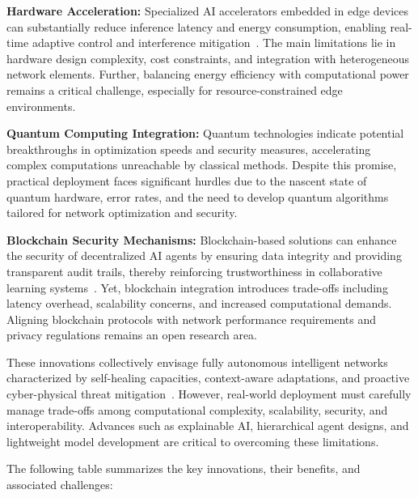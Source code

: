\documentclass[sigconf]{acmart}
\begin{document}
\textbf{Hardware Acceleration:} Specialized AI accelerators embedded in edge devices can substantially reduce inference latency and energy consumption, enabling real-time adaptive control and interference mitigation~\cite{ref50}. The main limitations lie in hardware design complexity, cost constraints, and integration with heterogeneous network elements. Further, balancing energy efficiency with computational power remains a critical challenge, especially for resource-constrained edge environments.

\textbf{Quantum Computing Integration:} Quantum technologies indicate potential breakthroughs in optimization speeds and security measures, accelerating complex computations unreachable by classical methods. Despite this promise, practical deployment faces significant hurdles due to the nascent state of quantum hardware, error rates, and the need to develop quantum algorithms tailored for network optimization and security.

\textbf{Blockchain Security Mechanisms:} Blockchain-based solutions can enhance the security of decentralized AI agents by ensuring data integrity and providing transparent audit trails, thereby reinforcing trustworthiness in collaborative learning systems~\cite{ref54}. Yet, blockchain integration introduces trade-offs including latency overhead, scalability concerns, and increased computational demands. Aligning blockchain protocols with network performance requirements and privacy regulations remains an open research area.

These innovations collectively envisage fully autonomous intelligent networks characterized by self-healing capacities, context-aware adaptations, and proactive cyber-physical threat mitigation~\cite{ref55}. However, real-world deployment must carefully manage trade-offs among computational complexity, scalability, security, and interoperability. Advances such as explainable AI, hierarchical agent designs, and lightweight model development are critical to overcoming these limitations.

\bigskip

The following table summarizes the key innovations, their benefits, and associated challenges:
\end{document}
